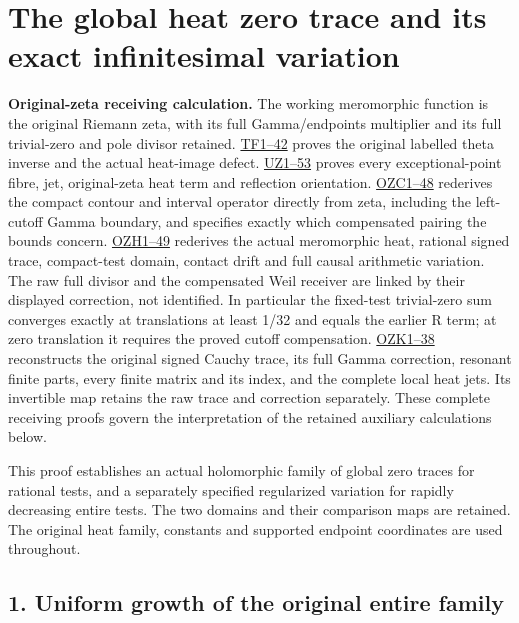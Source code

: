 \documentclass[
  10pt,
  a4paper,
]{article}
\author{}
\date{}
\begin{document}
{
\setcounter{tocdepth}{3}
\tableofcontents
}
\section{The global heat zero trace and its exact infinitesimal
variation}\label{the-global-heat-zero-trace-and-its-exact-infinitesimal-variation}

\textbf{Original-zeta receiving calculation.} The working meromorphic
function is the original Riemann zeta, with its full Gamma/endpoints
multiplier and its full trivial-zero and pole divisor retained.
\href{FAITHFUL_THETA_COMPLETION_RETURN.md}{TF1--42} proves the original
labelled theta inverse and the actual heat-image defect.
\href{FAITHFUL_UNCOMPLETED_ZETA_HEAT.md}{UZ1--53} proves every
exceptional-point fibre, jet, original-zeta heat term and reflection
orientation.
\href{ORIGINAL_ZETA_COMPACT_WEIL_RECONSTRUCTION.md}{OZC1--48} rederives
the compact contour and interval operator directly from zeta, including
the left-cutoff Gamma boundary, and specifies exactly which compensated
pairing the bounds concern.
\href{ORIGINAL_ZETA_HEAT_CONTACT_RECONSTRUCTION.md}{OZH1--49} rederives
the actual meromorphic heat, rational signed trace, compact-test domain,
contact drift and full causal arithmetic variation. The raw full divisor
and the compensated Weil receiver are linked by their displayed
correction, not identified. In particular the fixed-test trivial-zero
sum converges exactly at translations at least 1/32 and equals the
earlier R term; at zero translation it requires the proved cutoff
compensation. \href{ORIGINAL_ZETA_CAUCHY_RECONSTRUCTION.md}{OZK1--38}
reconstructs the original signed Cauchy trace, its full Gamma
correction, resonant finite parts, every finite matrix and its index,
and the complete local heat jets. Its invertible map retains the raw
trace and correction separately. These complete receiving proofs govern
the interpretation of the retained auxiliary calculations below.

This proof establishes an actual holomorphic family of global zero
traces for rational tests, and a separately specified regularized
variation for rapidly decreasing entire tests. The two domains and their
comparison maps are retained. The original heat family, constants and
supported endpoint coordinates are used throughout.

\subsection{1. Uniform growth of the original entire
family}\label{uniform-growth-of-the-original-entire-family}
\end{document}
